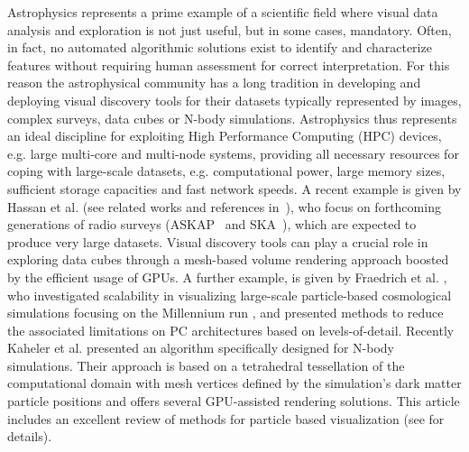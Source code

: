 \documentclass[1p]{elsarticle}
\begin{document}
Astrophysics represents a prime example of a scientific field where visual data analysis and exploration is not just useful, but in some cases, mandatory. Often, in fact, no automated algorithmic solutions exist to identify and characterize features without requiring human assessment for correct interpretation. For this reason the astrophysical community has a long tradition in developing and deploying visual discovery tools for their datasets typically represented by images, complex surveys, data cubes or N-body simulations. Astrophysics thus represents an ideal discipline for exploiting High Performance Computing (HPC) devices, e.g. large multi-core and multi-node systems, providing all necessary resources for coping with large-scale datasets, e.g. computational power, large memory sizes, sufficient storage capacities and fast network speeds. A recent example is given by Hassan et al. (see related works and references in~\cite{2012ASPC..461...45H}), who focus on forthcoming generations of radio surveys (ASKAP~\cite{askap} and SKA~\cite{ska}), which are expected to produce very large datasets. Visual discovery tools can play a crucial role in exploring data cubes through a mesh-based volume rendering approach boosted by the efficient usage of GPUs. A further example, is given by Fraedrich et al. \cite{Fraedrich:2009:TMV}, who
investigated scalability in visualizing large-scale particle-based cosmological 
simulations focusing on the Millennium run \cite{millennium}, and presented methods to reduce the associated limitations on PC architectures based on levels-of-detail.
Recently Kaheler et al. \cite{2012arXiv1208.3206K} presented an algorithm specifically designed for N-body simulations. Their approach is based on a tetrahedral tessellation of the computational domain with mesh vertices defined by the simulation's dark matter particle positions and offers several GPU-assisted rendering solutions. This article includes an excellent review of methods for particle based visualization (see \cite{2012arXiv1208.3206K} for details).
\end{document}
